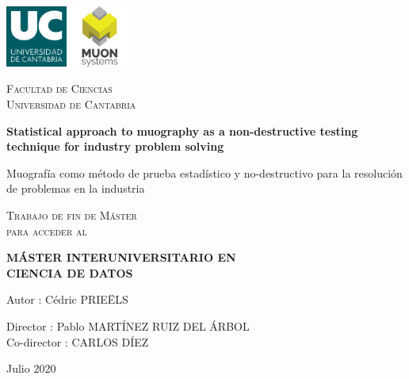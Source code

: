 \documentclass[a4paper, 11pt]{report}
\begin{document}

\begin{titlepage}

	\centering
	\includegraphics[width=0.15\textwidth]{figs/image_UC.png} \hspace{20pt} \includegraphics[width=0.15\textwidth]{figs/muonSystems.png} \par\vspace{1cm}
	{\scshape\LARGE Facultad de Ciencias \\ Universidad de Cantabria \par}
	
	\vspace{1.5cm}
	
	{\huge\bfseries Statistical approach to muography as a non-destructive testing technique for \newline industry problem solving}
	
	\vspace{0.6cm}
		
	{\LARGE Muograf\'ia como m\'etodo de prueba estad\'istico y no-destructivo para la resoluci\'on de problemas en la industria \par}
	
	\vspace{3cm}
	{\scshape\Large Trabajo de fin de M\'aster \\ para acceder al \par}
	\vspace{0.3cm}
	{\scshape\Large \textbf{M\'ASTER INTERUNIVERSITARIO EN \\ CIENCIA DE DATOS} \par}
	
	\begin{flushright}
	
	\vspace{3cm}
	{\Large Autor : C\'edric PRIE\"ELS\par}
	{\Large Director : Pablo MART\'INEZ RUIZ DEL \'ARBOL\\}
	{\Large Co-director : CARLOS D\'IEZ\\}
	\vspace{0.5cm}
	{\Large Julio 2020\par}
	\vfill
	
	\end{flushright}

\end{titlepage}
\end{document}
